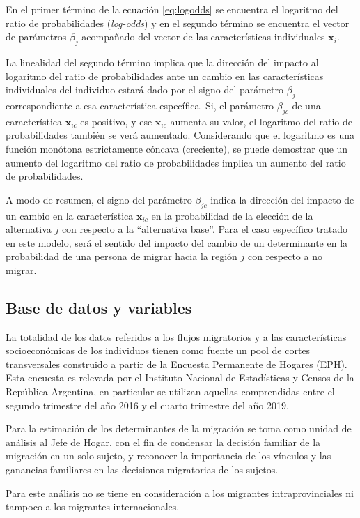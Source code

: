 \documentclass[12pt,a4paper]{article}
\begin{document}
En el primer término de la ecuación \ref{eq:logodds} se encuentra el logaritmo del ratio de probabilidades (\textit{log-odds}) y en el segundo término se encuentra el vector de parámetros $\beta_{j}$ acompañado del vector de las características individuales $\textbf{x}_{i}$. 

La linealidad del segundo término implica que la dirección del impacto al logaritmo del ratio de probabilidades ante  un cambio en las características individuales del individuo estará dado por el signo del parámetro $\beta_{j}$ correspondiente a esa característica específica. Si, el parámetro  $\beta_{jc}$ de una característica $\textbf{x}_{ic}$ es positivo, y ese $\textbf{x}_{ic}$  aumenta su valor, el logaritmo del ratio de probabilidades también se verá aumentado. Considerando que el logaritmo es una función monótona estrictamente cóncava (creciente), se puede demostrar que un aumento del logaritmo del ratio de probabilidades implica un aumento del ratio de probabilidades.

A modo de resumen, el signo del parámetro $\beta_{jc}$ indica la dirección del impacto de un cambio en la característica $\textbf{x}_{ic}$ en la probabilidad de la elección de la alternativa $j$ con respecto a la ``alternativa base''. Para el caso específico tratado en este modelo, será el sentido del impacto del cambio de un determinante en la probabilidad de una persona de migrar hacia la región $j$ con respecto a no migrar.

\subsection{Base de datos y variables}
La totalidad de los datos referidos a los flujos migratorios y a las características socioeconómicas de los individuos tienen como fuente un pool de cortes transversales  construido a partir de la Encuesta Permanente de Hogares (EPH). Esta encuesta es relevada por el Instituto Nacional de Estadísticas y Censos de la República Argentina, en particular se utilizan aquellas comprendidas entre el segundo trimestre del año 2016 y el cuarto trimestre del año 2019.

Para la estimación de los determinantes de la migración se toma como unidad de análisis al Jefe de Hogar, con el fin de condensar la decisión familiar de la migración en un solo sujeto, y reconocer la importancia de los vínculos y las ganancias familiares en las decisiones migratorias de los sujetos.

Para este análisis no se tiene en consideración a los migrantes intraprovinciales ni tampoco a los migrantes internacionales.
\end{document}
